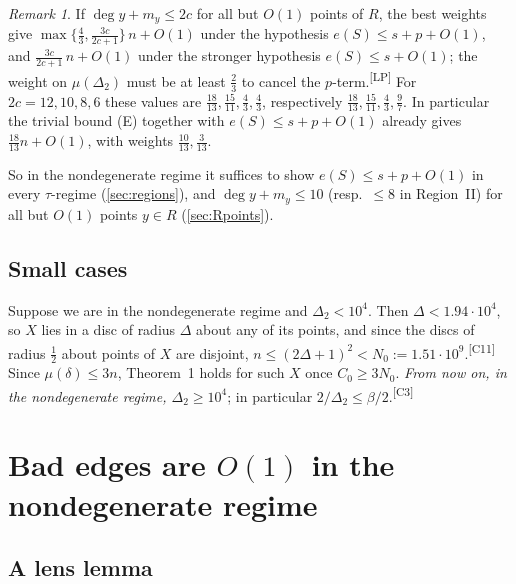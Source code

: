 \documentclass[11pt]{amsart}
\theoremstyle{definition}
\theoremstyle{remark}
\newtheorem{remark}[theorem]{Remark}
\newcommand{\Dt}{\Delta_2}
\newcommand{\mult}{\mu}
\newcommand{\chk}[1]{\textsuperscript{[#1]}}
\begin{document}
\begin{remark}\label{rem:lpvalues}
If $\deg y+m_y\le 2c$ for all but $O(1)$ points of $R$, the best weights give $\max\{\frac43,\frac{3c}{2c+1}\}\,n+O(1)$ under the hypothesis $e(S)\le s+p+O(1)$, and $\frac{3c}{2c+1}\,n+O(1)$ under the stronger hypothesis $e(S)\le s+O(1)$; the weight on $\mult(\Dt)$ must be at least $\frac23$ to cancel the $p$-term.\chk{LP} For $2c=12,10,8,6$ these values are $\frac{18}{13},\frac{15}{11},\frac43,\frac43$, respectively $\frac{18}{13},\frac{15}{11},\frac43,\frac97$. In particular the trivial bound (E) together with $e(S)\le s+p+O(1)$ already gives $\frac{18}{13}n+O(1)$, with weights $\frac{10}{13},\frac3{13}$.
\end{remark}

So in the nondegenerate regime it suffices to show $e(S)\le s+p+O(1)$ in every $\tau$-regime (\cref{sec:regions}), and $\deg y+m_y\le 10$ (resp.\ $\le 8$ in Region~II) for all but $O(1)$ points $y\in R$ (\cref{sec:Rpoints}).

\subsection*{Small cases}
Suppose we are in the nondegenerate regime and $\Dt<10^4$. Then $\Delta<1.94\cdot10^4$, so $X$ lies in a disc of radius $\Delta$ about any of its points, and since the discs of radius $\frac12$ about points of $X$ are disjoint, $n\le(2\Delta+1)^2<N_0:=1.51\cdot10^9$.\chk{C11} Since $\mult(\delta)\le 3n$, Theorem~1 holds for such $X$ once $C_0\ge 3N_0$. \emph{From now on, in the nondegenerate regime, $\Dt\ge 10^4$}; in particular $2/\Dt\le\beta/2$.\chk{C3}
\section{Bad edges are \texorpdfstring{$O(1)$}{O(1)} in the nondegenerate regime}\label{sec:bad}

\subsection{A lens lemma}
\end{document}
